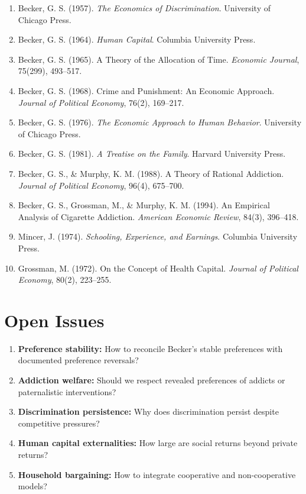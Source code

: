 \begin{enumerate}
    \item Becker, G. S. (1957). \textit{The Economics of Discrimination}. University of Chicago Press.
    \item Becker, G. S. (1964). \textit{Human Capital}. Columbia University Press.
    \item Becker, G. S. (1965). A Theory of the Allocation of Time. \textit{Economic Journal}, 75(299), 493--517.
    \item Becker, G. S. (1968). Crime and Punishment: An Economic Approach. \textit{Journal of Political Economy}, 76(2), 169--217.
    \item Becker, G. S. (1976). \textit{The Economic Approach to Human Behavior}. University of Chicago Press.
    \item Becker, G. S. (1981). \textit{A Treatise on the Family}. Harvard University Press.
    \item Becker, G. S., \& Murphy, K. M. (1988). A Theory of Rational Addiction. \textit{Journal of Political Economy}, 96(4), 675--700.
    \item Becker, G. S., Grossman, M., \& Murphy, K. M. (1994). An Empirical Analysis of Cigarette Addiction. \textit{American Economic Review}, 84(3), 396--418.
    \item Mincer, J. (1974). \textit{Schooling, Experience, and Earnings}. Columbia University Press.
    \item Grossman, M. (1972). On the Concept of Health Capital. \textit{Journal of Political Economy}, 80(2), 223--255.
\end{enumerate}

\section{Open Issues}
\label{sec:gb-open}

\begin{enumerate}
    \item \textbf{Preference stability:} How to reconcile Becker's stable preferences with documented preference reversals?
    \item \textbf{Addiction welfare:} Should we respect revealed preferences of addicts or paternalistic interventions?
    \item \textbf{Discrimination persistence:} Why does discrimination persist despite competitive pressures?
    \item \textbf{Human capital externalities:} How large are social returns beyond private returns?
    \item \textbf{Household bargaining:} How to integrate cooperative and non-cooperative models?
\end{enumerate}

